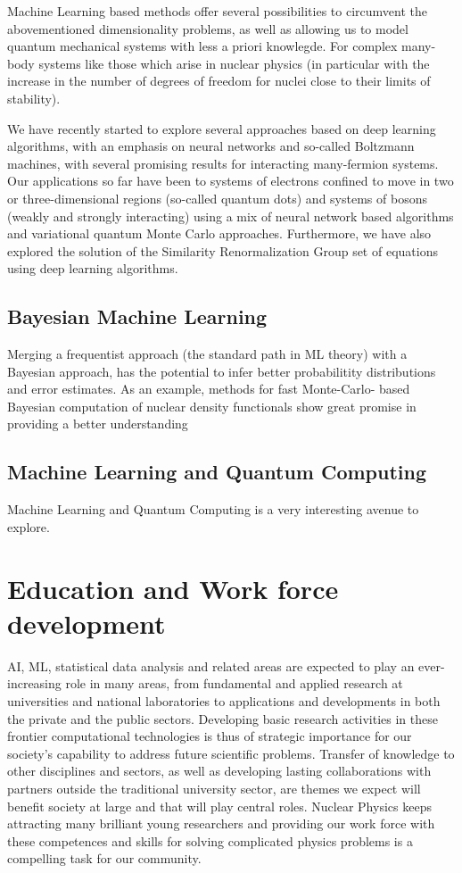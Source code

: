 \documentclass[%
oneside,                 %
final,                   %
10pt]{article}
\begin{document}
Machine Learning based methods offer several possibilities to
circumvent the abovementioned dimensionality problems, as well as
allowing us to model quantum mechanical systems with less a priori
knowlegde. For complex many-body systems like those which arise in
nuclear physics (in particular with the increase in the number of
degrees of freedom for nuclei close to their limits of stability).

We have recently started to explore several approaches based on deep
learning algorithms, with an emphasis on neural networks and so-called
Boltzmann machines, with several promising results for interacting
many-fermion systems. Our applications
so far have been to systems of electrons confined to move in two or
three-dimensional regions (so-called quantum dots) and systems of
bosons (weakly and strongly interacting) using a mix of neural network
based algorithms and variational quantum Monte Carlo approaches.
Furthermore, we have also explored the solution of the Similarity
Renormalization Group set of equations using deep learning algorithms.


\subsection{Bayesian Machine Learning}

Merging a frequentist approach (the standard path in ML theory) with a Bayesian approach, has the potential to infer better probabilitity distributions and error estimates. As an example, methods for fast Monte-Carlo- based Bayesian computation of nuclear density functionals show great promise in providing a better understanding 

\subsection{Machine Learning and Quantum Computing}
Machine Learning and Quantum Computing is a very interesting avenue to explore.



\section{Education and Work force development}

AI, ML, statistical data analysis and related areas are expected to
play an ever-increasing role in many areas, from fundamental and
applied research at universities and national laboratories to
applications and developments in both the private and the public
sectors.
Developing basic research activities in these frontier
computational technologies is thus of strategic importance for our
society’s capability to address future scientific problems. Transfer
of knowledge to other disciplines and sectors, as well as developing
lasting collaborations with partners outside the traditional
university sector, are themes we expect will benefit society at large
and that will play central roles. Nuclear Physics keeps attracting many brilliant young researchers and providing our work force with these competences and skills for solving complicated physics problems is a compelling task for our community.
\end{document}
